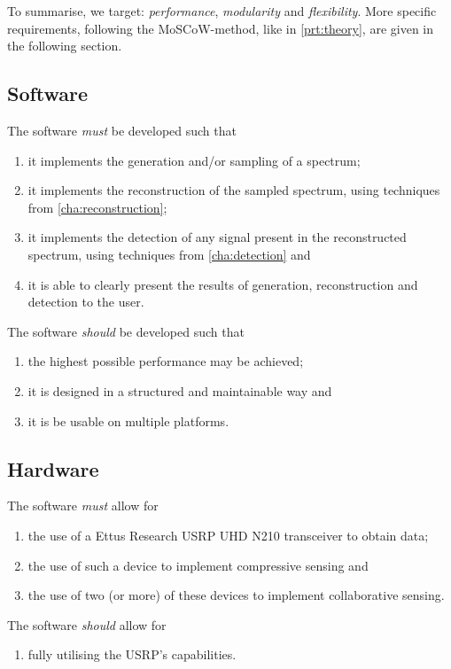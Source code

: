 \documentclass[a4paper, openany, oneside]{memoir}
\begin{document}
To summarise, we target: \emph{performance}, \emph{modularity} and \emph{flexibility}. More specific requirements, following the MoSCoW-method, like in \cref{prt:theory}, are given in the following section.

\subsection{Software}
The software \emph{must} be developed such that
\begin{enumerate}
    \item it implements the generation and/or sampling of a spectrum;
    \item it implements the reconstruction of the sampled spectrum, using techniques from \cref{cha:reconstruction};
    \item it implements the detection of any signal present in the reconstructed spectrum, using techniques from \cref{cha:detection} and
    \item it is able to clearly present the results of generation, reconstruction and detection to the user.
\end{enumerate}
The software \emph{should} be developed such that
\begin{enumerate}
    \item the highest possible performance may be achieved;
    \item it is designed in a structured and maintainable way and
    \item it is be usable on multiple platforms.
\end{enumerate}

\subsection{Hardware}
The software \emph{must} allow for
\begin{enumerate}
    \item the use of a Ettus Research USRP UHD N210 transceiver to obtain data;
    \item the use of such a device to implement compressive sensing and
    \item the use of two (or more) of these devices to implement collaborative sensing.
\end{enumerate}

The software \emph{should} allow for
\begin{enumerate}
    \item fully utilising the USRP's capabilities.
\end{enumerate}
\end{document}
